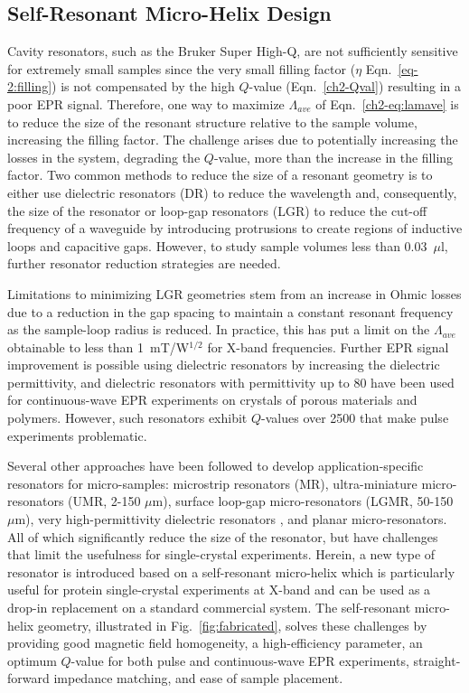 \subsection{Self-Resonant Micro-Helix Design}
Cavity resonators, such as the Bruker Super High-Q, are not sufficiently sensitive for extremely small samples since the very small filling factor ($\eta$ Eqn.~\ref{eq-2:filling}) is not compensated by the high $Q$-value (Eqn.~\ref{ch2-Qval}) resulting in a poor EPR signal. \cite{ReijerseSavitsky2017} Therefore, one way to maximize $\Lambda_{ave}$ of Eqn.~\ref{ch2-eq:lamave} is to reduce the size of the resonant structure relative to the sample volume, increasing the filling factor. The challenge arises due to potentially increasing the losses in the system, degrading the $Q$-value, more than the increase in the filling factor. Two common methods to reduce the size of a resonant geometry is to either use dielectric resonators (DR) to reduce the wavelength and, consequently, the size of the resonator or loop-gap resonators (LGR) to reduce the cut-off frequency of a waveguide by introducing protrusions to create regions of inductive loops and capacitive gaps. However, to study sample volumes less than 0.03~$\mu$l, further resonator reduction strategies are needed.

Limitations to minimizing LGR geometries stem from an increase in Ohmic losses due to a reduction in the gap spacing to maintain a constant resonant frequency as the sample-loop radius is reduced. In practice, this has put a limit on the $\Lambda_{ave}$ obtainable to less than 1~mT/W$^{1/2}$ for X-band frequencies. Further EPR signal improvement is possible using dielectric resonators by increasing the dielectric permittivity, and dielectric resonators with permittivity up to 80 have been used for continuous-wave EPR experiments on crystals of porous materials and polymers. \cite{dielectricReson1, dielectricReson2} However, such resonators exhibit $Q$-values over 2500 that make pulse experiments problematic. \cite{Friedlaender2015} 

Several other approaches have been followed to develop application-specific resonators for micro-samples: microstrip resonators (MR)\cite{Microstrip2009, GhirriMicroStrip}, ultra-miniature micro-resonators (UMR, 2-150 $\mu$m)\cite{AharonBlankUltra2013}, surface loop-gap micro-resonators (LGMR, 50-150 $\mu$m)\cite{AharonSurface2010}, very high-permittivity dielectric resonators \cite{walsh86, GOLOVINA200852}, and planar micro-resonators. \cite{Suter2005, Suter2008, suter2015} All of which significantly reduce the size of the resonator, but have challenges that limit the usefulness for single-crystal experiments. Herein, a new type of resonator is introduced based on a self-resonant micro-helix which is particularly useful for protein single-crystal experiments at X-band and can be used as a drop-in replacement on a standard commercial system. The self-resonant micro-helix geometry, illustrated in Fig.~\ref{fig:fabricated}, solves these challenges by providing good magnetic field homogeneity, a high-efficiency parameter, an optimum $Q$-value for both pulse and continuous-wave EPR experiments, straight-forward impedance matching, and ease of sample placement. 

